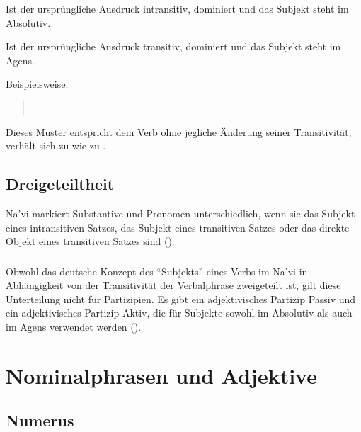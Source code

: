 \begin{itemize*}
	\item Ist der ursprüngliche Ausdruck intransitiv, dominiert  und das Subjekt steht im Absolutiv.
	\item Ist der ursprüngliche Ausdruck transitiv, dominiert  und das Subjekt steht im Agens.
\end{itemize*} 

\noindent Beispielsweise:

\begin{quotation}
	\noindent{} \\
	\noindent{} 
\end{quotation}

\noindent Dieses Muster entspricht dem Verb ohne jegliche Änderung seiner Transitivität;  verhält sich zu  wie  zu .

\subsection{Dreigeteiltheit} Na'vi markiert Substantive und Pronomen unterschiedlich, wenn sie das Subjekt eines intransitiven Satzes, das Subjekt eines transitiven Satzes oder das direkte Objekt eines transitiven Satzes sind ().

\subsubsection{} Obwohl das deutsche Konzept des ``Subjekts'' eines Verbs im Na'vi in Abhängigkeit von der Transitivität der Verbalphrase zweigeteilt ist, gilt diese Unterteilung nicht für Partizipien. Es gibt ein adjektivisches Partizip Passiv und ein adjektivisches Partizip Aktiv, die für Subjekte sowohl im Absolutiv als auch im Agens verwendet werden ().


\section{Nominalphrasen und Adjektive}

\subsection{Numerus} 

